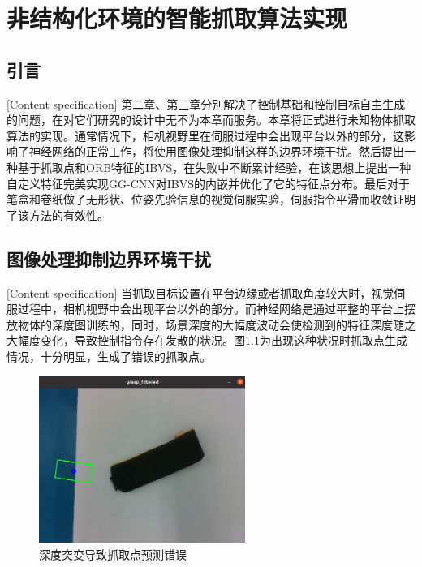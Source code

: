 \documentclass[fontset=fandol,type=bachelor,campus=harbin,bsmainpagenumberline=true]{hithesisbook}
\begin{document}
\chapter[非结构化环境的智能抓取算法实现]{非结构化环境的智能抓取算法实现}
\section{引言}[Content specification]
第二章、第三章分别解决了控制基础和控制目标自主生成的问题，在对它们研究的设计中无不为本章而服务。本章将正式进行未知物体抓取算法的实现。通常情况下，相机视野里在伺服过程中会出现平台以外的部分，这影响了神经网络的正常工作，将使用图像处理抑制这样的边界环境干扰。然后提出一种基于抓取点和ORB特征的IBVS，在失败中不断累计经验，在该思想上提出一种自定义特征完美实现GG-CNN对IBVS的内嵌并优化了它的特征点分布。最后对于笔盒和卷纸做了无形状、位姿先验信息的视觉伺服实验，伺服指令平滑而收敛证明了该方法的有效性。

\section{图像处理抑制边界环境干扰}[Content specification]
当抓取目标设置在平台边缘或者抓取角度较大时，视觉伺服过程中，相机视野中会出现平台以外的部分。而神经网络是通过平整的平台上摆放物体的深度图训练的，同时，场景深度的大幅度波动会使检测到的特征深度随之大幅度变化，导致控制指令存在发散的状况。图\ref{深度突变导致抓取点预测错误}为出现这种状况时抓取点生成情况，十分明显，生成了错误的抓取点。
\begin{figure}[h]
\centering
\includegraphics[width = 0.6\textwidth]{chapter4/深度突变导致抓取点预测错误}
\caption{深度突变导致抓取点预测错误}
\label{深度突变导致抓取点预测错误}
\end{figure}
\end{document}
